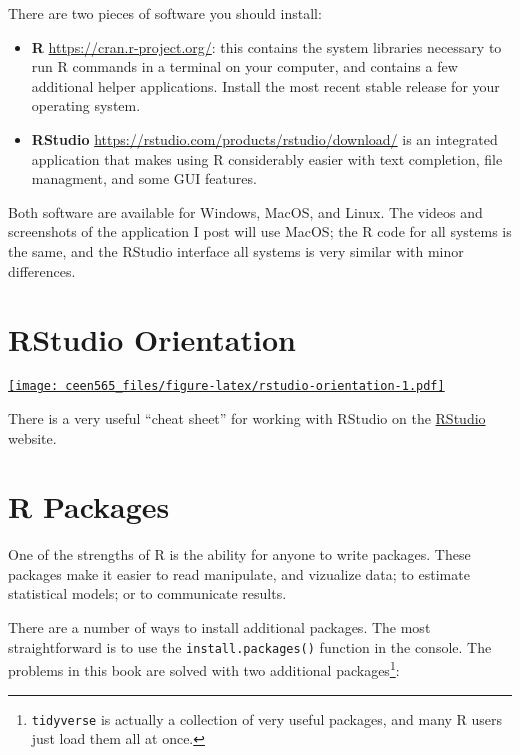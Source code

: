 \documentclass[]{book}
\providecommand{\tightlist}{%
  \setlength{\itemsep}{0pt}\setlength{\parskip}{0pt}}
\let\rmarkdownfootnote\footnote%
\def\footnote{\protect\rmarkdownfootnote}
\begin{document}
There are two pieces of software you should install:

\begin{itemize}
\tightlist
\item
  \textbf{R} \url{https://cran.r-project.org/}: this contains
  the system libraries necessary to run R commands in a terminal on your computer,
  and contains a few additional helper applications. Install the most recent
  stable release for your operating system.
\item
  \textbf{RStudio} \url{https://rstudio.com/products/rstudio/download/} is an integrated application that makes using R considerably easier
  with text completion, file managment, and some GUI features.
\end{itemize}

Both software are available for Windows, MacOS, and Linux. The videos and screenshots
of the application I post will use MacOS; the R code for all systems is the same,
and the RStudio interface all systems is very similar with minor differences.

\hypertarget{rstudio-orientation}{%
\section{RStudio Orientation}\label{rstudio-orientation}}

\href{http://www.youtube.com/embed/c3xv8wOIj-g?rel=0}{\texttt{[image: ceen565\_files/figure-latex/rstudio-orientation-1.pdf]}}

There is a very useful ``cheat sheet'' for working with RStudio on the \href{https://resources.rstudio.com/rstudio-cheatsheets/rstudio-ide-cheat-sheet}{RStudio}
website.

\hypertarget{r-packages}{%
\section{R Packages}\label{r-packages}}

One of the strengths of R is the ability for anyone to write packages. These
packages make it easier to read manipulate, and vizualize data; to estimate
statistical models; or to communicate results.

There are a number of ways to install additional packages. The most straightforward
is to use the \texttt{install.packages()} function in the console. The problems
in this book are solved with two additional packages\footnote{\texttt{tidyverse} is actually a collection
  of very useful packages, and many R users just load them all at once.}:
\end{document}
